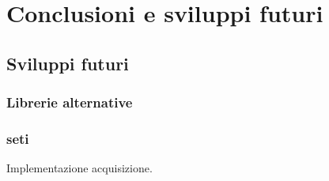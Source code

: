 \chapter{Conclusioni e sviluppi futuri}
\label{conclusions}
\section{Sviluppi futuri}
\subsection{Librerie alternative}
\label{altlib}
\subsection{\ac{seti}}
\label{seti}
Implementazione acquisizione.
